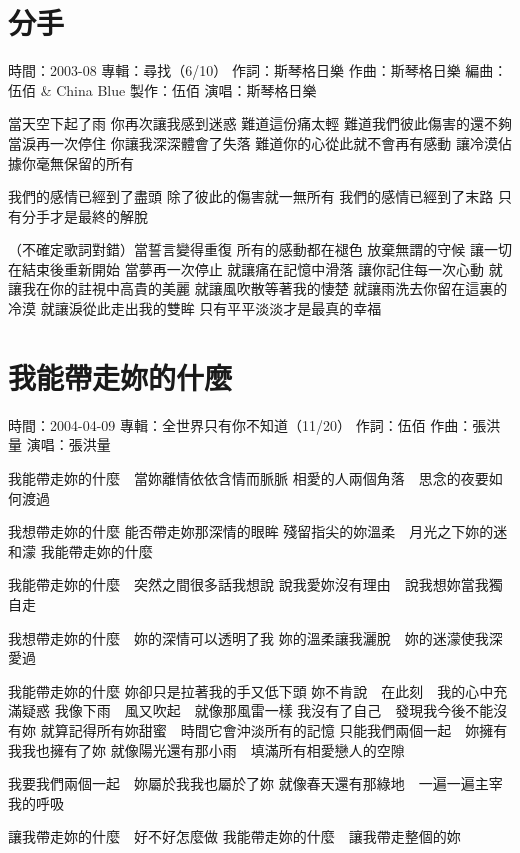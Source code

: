 \documentclass[UTF8,a4paper,oneside,twocolumn,12pt]{ctexbook}
\newcommand{\infopair}[2]{\textbullet #1：#2}
\newcommand{\zc}[1][伍佰]{\infopair{作詞}{#1}}
\newcommand{\zq}[1][伍佰]{\infopair{作曲}{#1}}
\newcommand{\bq}[1][伍佰]{\infopair{編曲}{#1}}
\newcommand{\zj}[1]{\infopair{專輯}{#1}}
\newcommand{\zz}[1]{\infopair{製作}{#1}}
\newcommand{\sj}[1]{\infopair{時間}{#1}}
\newenvironment{info}{\begin{flushleft}\kaishu
	}
	{\end{flushleft}\normalsize\yahei\par}
\newenvironment{lyric}{
	}
{}
\begin{document}
\section{分手}
\begin{info}
	\sj{2003-08}
	\zj{尋找（6/10）}
	\zc[斯琴格日樂]
	\zq[斯琴格日樂]
	\bq[伍佰 \& China Blue]
	\zz{伍佰}
	\infopair{演唱}{斯琴格日樂}
\end{info}
\begin{lyric}
	當天空下起了雨
	你再次讓我感到迷惑
	難道這份痛太輕
	難道我們彼此傷害的還不夠
	當淚再一次停住
	你讓我深深體會了失落
	難道你的心從此就不會再有感動
	讓冷漠佔據你毫無保留的所有

	我們的感情已經到了盡頭
	除了彼此的傷害就一無所有
	我們的感情已經到了末路
	只有分手才是最終的解脫

	（不確定歌詞對錯）當誓言變得重復
	所有的感動都在褪色
	放棄無謂的守候
	讓一切在結束後重新開始
	當夢再一次停止
	就讓痛在記憶中滑落
	讓你記住每一次心動
	就讓我在你的註視中高貴的美麗
	就讓風吹散等著我的悽楚
	就讓雨洗去你留在這裏的冷漠
	就讓淚從此走出我的雙眸
	只有平平淡淡才是最真的幸福
\end{lyric}

\section{我能帶走妳的什麼}
\begin{info}
	\sj{2004-04-09}
	\zj{全世界只有你不知道（11/20）}
	\zc[伍佰]
	\zq[張洪量]
	\infopair{演唱}{張洪量}
\end{info}
\begin{lyric}
	我能帶走妳的什麼　當妳離情依依含情而脈脈
	相愛的人兩個角落　思念的夜要如何渡過

	我想帶走妳的什麼
	能否帶走妳那深情的眼眸
	殘留指尖的妳溫柔　月光之下妳的迷和濛
	我能帶走妳的什麼

	我能帶走妳的什麼　突然之間很多話我想說
	說我愛妳沒有理由　說我想妳當我獨自走

	我想帶走妳的什麼　妳的深情可以透明了我
	妳的溫柔讓我灑脫　妳的迷濛使我深愛過

	我能帶走妳的什麼
	妳卻只是拉著我的手又低下頭
	妳不肯說　在此刻　我的心中充滿疑惑
	我像下雨　風又吹起　就像那風雷一樣
	我沒有了自己　發現我今後不能沒有妳
	就算記得所有妳甜蜜　時間它會沖淡所有的記憶
	只能我們兩個一起　妳擁有我我也擁有了妳
	就像陽光還有那小雨　填滿所有相愛戀人的空隙

	我要我們兩個一起　妳屬於我我也屬於了妳
	就像春天還有那綠地　一遍一遍主宰我的呼吸

	讓我帶走妳的什麼　好不好怎麼做
	我能帶走妳的什麼　讓我帶走整個的妳
\end{lyric}
\end{document}
